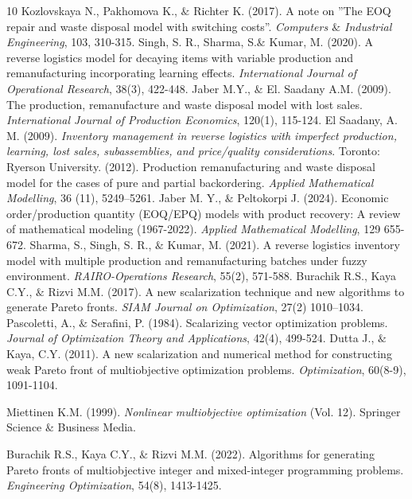 \documentclass[11pt]{article}
\begin{document}
\begin{thebibliography}{10}
 {Kozlovskaya N., Pakhomova K., $\&$ Richter K.} (2017). A note on ''The EOQ repair and waste disposal model with switching costs''. {\it Computers $\&$ Industrial Engineering}, 103, 310-315.
  {Singh, S. R., Sharma, S.$\&$  Kumar, M.} (2020). A reverse logistics model for decaying items with variable production and remanufacturing incorporating learning effects. {\it International Journal of Operational Research}, 38(3), 422-448.
  {Jaber M.Y., $\&$ El. Saadany A.M.} (2009).
 The production, remanufacture and waste disposal model with lost sales. {\it International Journal of Production Economics}, 120(1), 115-124.
  {El Saadany, A. M.} (2009). 
{\it Inventory management in reverse logistics with imperfect production, learning, lost sales, subassemblies, and price/quality considerations}. Toronto: Ryerson University.
 (2012). Production remanufacturing and waste disposal model for the cases of pure and partial backordering. {\it Applied  Mathematical Modelling}, 36 (11), 5249–5261.
 {Jaber M. Y., $\&$ Peltokorpi J.} (2024).
 Economic order/production quantity (EOQ/EPQ) models with product recovery: A review of mathematical modeling (1967-2022). {\it Applied  Mathematical Modelling}, 129 655-672.
  {Sharma, S., Singh, S. R., $\&$ Kumar, M.} (2021). A reverse logistics inventory model with multiple production and remanufacturing batches under fuzzy environment. {\it RAIRO-Operations Research}, 55(2), 571-588.
 {Burachik R.S., Kaya C.Y., $\&$ Rizvi M.M.} (2017). A new scalarization technique and new algorithms to generate Pareto fronts. {\it SIAM Journal on Optimization}, 27(2) 1010--1034.
   {Pascoletti, A., $\&$ Serafini, P.} (1984).
Scalarizing vector optimization problems. {\it Journal of Optimization Theory and Applications}, 42(4), 499-524.
{Dutta J., $\&$ Kaya, C.Y.} (2011).
A new scalarization and numerical method for constructing weak Pareto front of multiobjective optimization problems. {\it Optimization}, 60(8-9), 1091-1104.

 {Miettinen K.M.} (1999). {\it Nonlinear multiobjective optimization} (Vol. 12). Springer Science $\&$ Business Media.
 
 {Burachik R.S., Kaya C.Y., $\&$ Rizvi M.M.} (2022). Algorithms for generating Pareto fronts of multiobjective integer and mixed-integer programming problems. {\it Engineering Optimization}, 54(8), 1413-1425.


\end{thebibliography}
\end{document}
